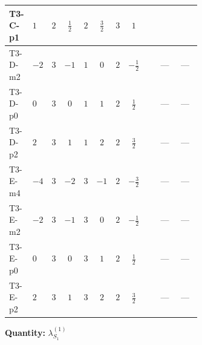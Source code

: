 \documentclass[8pt]{article}
\begin{document}
\begin{landscape}
\begin{longtable}{@{}llcccccc >{\raggedright\arraybackslash}p{0.21\linewidth} >{\raggedright\arraybackslash}p{0.21\linewidth} >{\raggedright\arraybackslash}p{0.21\linewidth}@{}}
\midrule
T3-C-p1 & $1$ & $2$ & $\frac{1}{2}$ & $2$ & $\frac{3}{2}$ & $3$ & $1$ & \scriptsize\adjustbox{max width=\linewidth}{$\begin{gathered} +12 {\lambda_{S_1}^{(1)}}^2\end{gathered}$} & \scriptsize\adjustbox{max width=\linewidth}{$\begin{gathered} +\frac{9 {g_2}^4}{4}\end{gathered}$} & \scriptsize\adjustbox{max width=\linewidth}{$\begin{gathered} +{g_1}^2 \left(\frac{3 {g_2}^2}{2}-3 {\lambda_{S_1}^{(1)}}\right)\end{gathered}$} \\
\midrule
T3-D-m2 & $-2$ & $3$ & $-1$ & $1$ & $0$ & $2$ & $-\frac{1}{2}$ & \scriptsize\adjustbox{max width=\linewidth}{$\begin{gathered} +14 {\lambda_{S_1}^{(1)}}^2\end{gathered}$} & --- & --- \\
\midrule
T3-D-p0 & $0$ & $3$ & $0$ & $1$ & $1$ & $2$ & $\frac{1}{2}$ & \scriptsize\adjustbox{max width=\linewidth}{$\begin{gathered} +14 {\lambda_{S_1}^{(1)}}^2\end{gathered}$} & --- & --- \\
\midrule
T3-D-p2 & $2$ & $3$ & $1$ & $1$ & $2$ & $2$ & $\frac{3}{2}$ & \scriptsize\adjustbox{max width=\linewidth}{$\begin{gathered} +14 {\lambda_{S_1}^{(1)}}^2\end{gathered}$} & --- & --- \\
\midrule
T3-E-m4 & $-4$ & $3$ & $-2$ & $3$ & $-1$ & $2$ & $-\frac{3}{2}$ & \scriptsize\adjustbox{max width=\linewidth}{$\begin{gathered} +14 {\lambda_{S_1}^{(1)}}^2\end{gathered}$} & --- & --- \\
\midrule
T3-E-m2 & $-2$ & $3$ & $-1$ & $3$ & $0$ & $2$ & $-\frac{1}{2}$ & \scriptsize\adjustbox{max width=\linewidth}{$\begin{gathered} +14 {\lambda_{S_1}^{(1)}}^2\end{gathered}$} & --- & --- \\
\midrule
T3-E-p0 & $0$ & $3$ & $0$ & $3$ & $1$ & $2$ & $\frac{1}{2}$ & \scriptsize\adjustbox{max width=\linewidth}{$\begin{gathered} +14 {\lambda_{S_1}^{(1)}}^2\end{gathered}$} & --- & --- \\
\midrule
T3-E-p2 & $2$ & $3$ & $1$ & $3$ & $2$ & $2$ & $\frac{3}{2}$ & \scriptsize\adjustbox{max width=\linewidth}{$\begin{gathered} +14 {\lambda_{S_1}^{(1)}}^2\end{gathered}$} & --- & --- \\
\midrule
\bottomrule
\end{longtable}
\clearpage
\noindent\textbf{Quantity: }$\lambda_{S_1}^{(1)}$\par\smallskip

\end{landscape}
\end{document}

